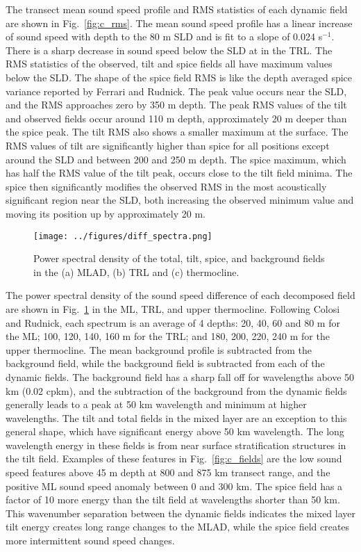 \documentclass[preprint,NumberedRefs]{JASA}
\begin{document}
The transect mean sound speed profile and RMS statistics of each dynamic field are shown in Fig.~\ref{fig:c_rms}. The mean sound speed profile has a linear increase of sound speed with depth to the 80 m SLD and is fit to a slope of 0.024 s$^{-1}$. There is a sharp decrease in sound speed below the SLD at in the TRL. The RMS statistics of the observed, tilt and spice fields all have maximum values below the SLD. The shape of the spice field RMS is like the depth averaged spice variance reported by Ferrari and Rudnick\citep{ferrari2000}. The peak value occurs near the SLD, and the RMS approaches zero by 350 m depth. The peak RMS values of the tilt and observed fields occur around 110 m depth, approximately 20 m deeper than the spice peak. The tilt RMS also shows a smaller maximum at the surface. The RMS values of tilt are significantly higher than spice for all positions except around the SLD and between 200 and 250 m depth. The spice maximum, which has half the RMS value of the tilt peak, occurs close to the tilt field minima. The spice then significantly modifies the observed RMS in the most acoustically significant region near the SLD, both increasing the observed minimum value and moving its position up by approximately 20 m.

\begin{figure}
\texttt{[image: ../figures/diff\_spectra.png]}
        \caption{\label{fig:spectra}{Power spectral density of the total, tilt, spice, and background fields in the (a) MLAD, (b) TRL and (c) thermocline.}}
\end{figure}
The power spectral density of the sound speed difference of each decomposed field are shown in Fig.~\ref{fig:spectra} in the ML, TRL, and upper thermocline. Following Colosi and Rudnick\cite{colosi2020observations}, each spectrum is an average of 4 depths: 20, 40, 60 and 80 m for the ML; 100, 120, 140, 160 m for the TRL; and 180, 200, 220, 240 m for the upper thermocline. The mean background profile is subtracted from the background field, while the background field is subtracted from each of the dynamic fields. The background field has a sharp fall off for wavelengths above 50 km (0.02 cpkm), and the subtraction of the background from the dynamic fields generally leads to a peak at 50 km wavelength and minimum at higher wavelengths. The tilt and total fields in the mixed layer are an exception to this general shape, which have significant energy above 50 km wavelength. The long wavelength energy in these fields is from near surface stratification structures in the tilt field. Examples of these features in Fig.~\ref{fig:c_fields} are the low sound speed features above 45 m depth at 800 and 875 km transect range, and the positive ML sound speed anomaly between 0 and 300 km. The spice field has a factor of 10 more energy than the tilt field at wavelengths shorter than 50 km. This wavenumber separation between the dynamic fields indicates the mixed layer tilt energy creates long range changes to the MLAD, while the spice field creates more intermittent sound speed changes.
\end{document}
